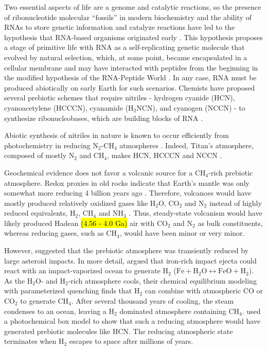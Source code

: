 Two essential aspects of life are a genome and catalytic reactions, so the presence of ribonucleotide molecular ``fossils'' in modern biochemistry \citep{White_1976,Goldman_2021} and the ability of RNAs to store genetic information and catalyze reactions have led to the hypothesis that RNA-based organisms originated early \hl{\mbox{\citep{Cech_2012,Gilbert_1986}}}. This hypothesis proposes a stage of primitive life with RNA as a self-replicating genetic molecule that evolved by natural selection, which, at some point, became encapsulated in a cellular membrane and may have interacted with peptides from the beginning in the modified hypothesis of the RNA-Peptide World \citep[e.g.][]{Di_1997,Muller_2022}. In any case, RNA must be produced abiotically on early Earth for such scenarios. Chemists have proposed several prebiotic schemes that require nitriles - hydrogen cyanide (HCN), cyanoacetylene (HCCCN), cyanamide (H$_2$NCN), and cyanogen (NCCN) - to synthesize ribonucleobases, which are building blocks of RNA \citep{Benner_2020,Sutherland_2016,Yadav_2020}.

Abiotic synthesis of nitriles in nature is known to occur efficiently from photochemistry in reducing N$_2$-CH$_4$ atmospheres \citep{Zahnle_1986,Tian_2011}. Indeed, Titan's atmosphere, composed of mostly N$_2$ and CH$_4$, makes HCN, HCCCN and NCCN \citep{Strobel_2009}.

Geochemical evidence does not favor a volcanic source for a CH$_4$-rich prebiotic atmosphere. Redox proxies in old rocks indicate that Earth's mantle was only somewhat more reducing 4 billion years ago \citep{Aulbach_2016,Nicklas_2019}. Therefore, volcanoes would have mostly produced relatively oxidized gases like H$_2$O, CO$_2$ and N$_2$ instead of highly reduced equivalents, H$_2$, CH$_4$ and NH$_3$ \citep{Holland_1984,Catling_2017,Wogan_2020}. Thus, steady-state volcanism would have likely produced Hadean \hl{(4.56 - 4.0 Ga)} air with CO$_2$ and N$_2$ as bulk constituents, whereas reducing gases, such as CH$_4$, would have been minor or very minor.

However, \citet{Urey_1952} suggested that the prebiotic atmosphere was transiently reduced by large asteroid impacts. In more detail, \citet{Zahnle_2020} argued that iron-rich impact ejecta could react with an impact-vaporized ocean to generate H$_2$ ($\mathrm{Fe} + \mathrm{H_2O} \leftrightarrow \mathrm{FeO} + \mathrm{H_2}$). As the H$_2$O- and H$_2$-rich atmosphere cools, their chemical equilibrium modeling with parameterized quenching finds that H$_2$ can combine with atmospheric CO or CO$_2$ to generate CH$_4$. After several thousand years of cooling, the steam condenses to an ocean, leaving a H$_2$ dominated atmosphere containing CH$_4$. \citet{Zahnle_2020} used a photochemical box model to show that such a reducing atmosphere would have generated prebiotic molecules like HCN. The reducing atmospheric state terminates when H$_2$ escapes to space after millions of years.

